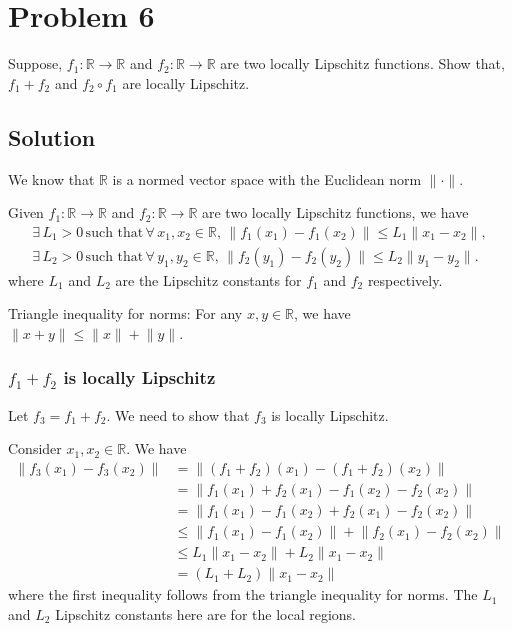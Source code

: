 \section*{Problem 6}

Suppose, \( f_1 : \mathbb{R} \rightarrow \mathbb{R} \) and \( f_2 : \mathbb{R} \rightarrow \mathbb{R} \) are two locally Lipschitz functions.
Show that, \( f_1 + f_2 \) and \( f_2 \circ f_1 \) are locally Lipschitz.

\subsection*{Solution}

We know that \( \mathbb{R} \) is a normed vector space with the Euclidean norm \( \lVert \cdot \rVert \).

Given \( f_1 : \mathbb{R} \rightarrow \mathbb{R} \) and \( f_2 : \mathbb{R} \rightarrow \mathbb{R} \) are two locally Lipschitz functions, we have
\begin{align*}
    \exists \, L_1 > 0 \, \text{such that} \, \forall \, x_1, x_2 \in \mathbb{R}, \, \lVert f_1(x_1) - f_1(x_2) \rVert \leq L_1 \lVert x_1 - x_2 \rVert, \\
    \exists \, L_2 > 0 \, \text{such that} \, \forall \, y_1, y_2 \in \mathbb{R}, \, \lVert f_2(y_1) - f_2(y_2) \rVert \leq L_2 \lVert y_1 - y_2 \rVert .
\end{align*}
where \( L_1 \) and \( L_2 \) are the Lipschitz constants for \( f_1 \) and \( f_2 \) respectively.

\begin{lemma}{Triangle inequality for norms:}
    For any \( x, y \in \mathbb{R} \), we have \( \lVert x + y \rVert \leq \lVert x \rVert + \lVert y \rVert \).
\end{lemma}

\subsubsection*{\( f_1 + f_2 \) is locally Lipschitz}

Let \( f_3 = f_1 + f_2 \).
We need to show that \( f_3 \) is locally Lipschitz.

Consider \( x_1, x_2 \in \mathbb{R} \).
We have
\begin{align*}
    \lVert f_3(x_1) - f_3(x_2) \rVert
     & =
    \lVert (f_1 + f_2)(x_1) - (f_1 + f_2)(x_2) \rVert
    \\ & =
    \lVert f_1(x_1) + f_2(x_1) - f_1(x_2) - f_2(x_2) \rVert
    \\ & =
    \lVert f_1(x_1) - f_1(x_2) + f_2(x_1) - f_2(x_2) \rVert
    \\ & \leq
    \lVert f_1(x_1) - f_1(x_2) \rVert + \lVert f_2(x_1) - f_2(x_2) \rVert
    \\ & \leq
    L_1 \lVert x_1 - x_2 \rVert + L_2 \lVert x_1 - x_2 \rVert
    \\ & = (L_1 + L_2) \lVert x_1 - x_2 \rVert
\end{align*}
where the first inequality follows from the triangle inequality for norms.
The \( L_1 \) and \( L_2 \) Lipschitz constants here are for the local regions.


